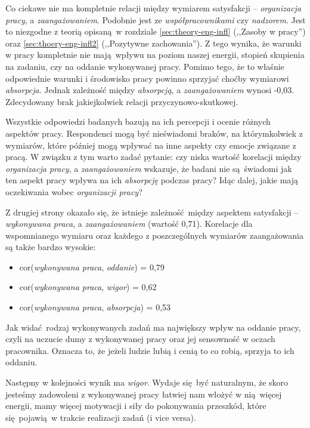 Co ciekawe nie ma kompletnie relacji między wymiarem satysfakcji -- \textit{organizacja pracy}, a \textit{zaangażowaniem}. Podobnie jest ze \textit{współpracownikami} czy \textit{nadzorem}. Jest to niezgodne z teorią opisaną w rozdziale \ref{sec:theory-eng-infl} (,,Zasoby w pracy'') oraz \ref{sec:thoery-eng-infl2} (,,Pozytywne zachowania''). Z tego wynika, że warunki w pracy kompletnie nie mają wpływu na poziom naszej energii, stopień skupienia na zadaniu, czy na oddanie
wykonywanej pracy. Pomimo tego, że to właśnie odpowiednie warunki i środowisko pracy powinno sprzyjać choćby wymiarowi \textit{absorpcja}. Jednak zależność między \textit{absorpcją}, a \textit{zaangażowaniem} wynosi
-0,03. Zdecydowany brak jakiejkolwiek relacji przyczynowo-skutkowej.

Wszystkie odpowiedzi badanych bazują na ich percepcji i ocenie różnych aspektów pracy. Respondenci mogą być nieświadomi braków, na którymkolwiek z wymiarów, które później mogą wpływać na inne aspekty czy emocje związane z pracą. W związku z tym warto zadać pytanie: czy niska wartość korelacji między \textit{organizacja pracy}, a \textit{zaangażowaniem} wskazuje, że badani nie są świadomi jak ten aspekt pracy wpływa na ich \textit{absorpcję} podczas pracy? Idąc dalej, jakie mają oczekiwania wobec
\textit{organizacji pracy}?

Z drugiej strony okazało się, że istnieje zależność między aspektem satysfakcji --\textit{wykonywana praca}, a \textit{zaangażowaniem} (wartość 0,71). Korelacje dla wspomnianego wymiaru oraz każdego z poszczególnych wymiarów zaangażowania są także bardzo wysokie:
\begin{itemize}
  \item cor(\textit{wykonywana praca}, \textit{oddanie}) = 0,79
  \item cor(\textit{wykonywana praca}, \textit{wigor}) = 0,62
  \item cor(\textit{wykonywana praca}, \textit{absorpcja}) = 0,53
\end{itemize}
Jak widać rodzaj wykonywanych zadań ma największy wpływ na oddanie pracy, czyli na uczucie dumy z wykonywanej pracy oraz jej sensowność w oczach pracownika. Oznacza to, że jeżeli ludzie lubią i cenią to co robią, sprzyja to ich oddaniu. 

Następny w kolejności wynik ma \textit{wigor}. Wydaje się być naturalnym, że skoro jesteśmy zadowoleni z wykonywanej pracy łatwiej nam włożyć w nią więcej energii, mamy więcej motywacji i siły do pokonywania przeszkód, które się pojawią w trakcie
realizacji zadań (i vice versa). 

